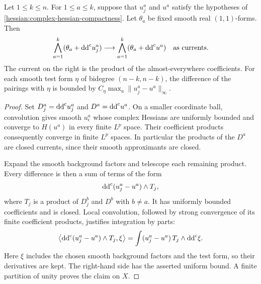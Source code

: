 \begin{lemma}\label{hessian:complex-hessian-products}
Let $1\leq k\leq n$. For $1\leq a\leq k$, suppose that $u_j^a$ and $u^a$ satisfy
the hypotheses of \cref{hessian:complex-hessian-compactness}. Let $\theta_a$ be fixed smooth real $(1,1)$-forms. Then
\[
 \bigwedge_{a=1}^k(\theta_a+\mathrm{dd}^{\mathrm{c}} u_j^a)
       \longrightarrow
 \bigwedge_{a=1}^k(\theta_a+\mathrm{dd}^{\mathrm{c}} u^a)
       \quad\text{as currents}.
\]
The current on the right is the product of the almost-everywhere
coefficients. For each smooth test form $\eta$ of bidegree $(n-k,n-k)$, the
difference of the pairings with $\eta$ is bounded by
$C_\eta\max_a\|u_j^a-u^a\|_\infty$.
\end{lemma}
\begin{proof}
Set $D_j^a=\mathrm{dd}^{\mathrm{c}} u_j^a$ and $D^a=\mathrm{dd}^{\mathrm{c}} u^a$.
On a smaller coordinate ball, convolution gives smooth $u_\epsilon^a$
whose complex Hessians are uniformly bounded and converge to $H(u^a)$
in every finite $L^p$ space. Their coefficient products consequently
converge in finite $L^p$ spaces. In particular the products of the $D^a$
are closed currents, since their smooth approximants are closed.

Expand the smooth background factors and telescope each remaining
product. Every difference is then a sum of terms of the form
\[
 \mathrm{dd}^{\mathrm{c}}(u_j^a-u^a)\wedge T_j,
\]
where $T_j$ is a product of $D_j^b$ and $D^b$ with $b\ne a$.
It has uniformly bounded coefficients and is closed.
Local convolution, followed by strong convergence of its finite
coefficient products, justifies integration by parts:
\[
 \left\langle\mathrm{dd}^{\mathrm{c}}(u_j^a-u^a)\wedge T_j,\xi\right\rangle
       =\int (u_j^a-u^a)\,T_j\wedge\mathrm{dd}^{\mathrm{c}}\xi.
\]
Here $\xi$ includes the chosen smooth background factors and the test
form, so their derivatives are kept. The right-hand side has the
asserted uniform bound. A finite partition of unity proves the claim on
$X$.
\end{proof}


